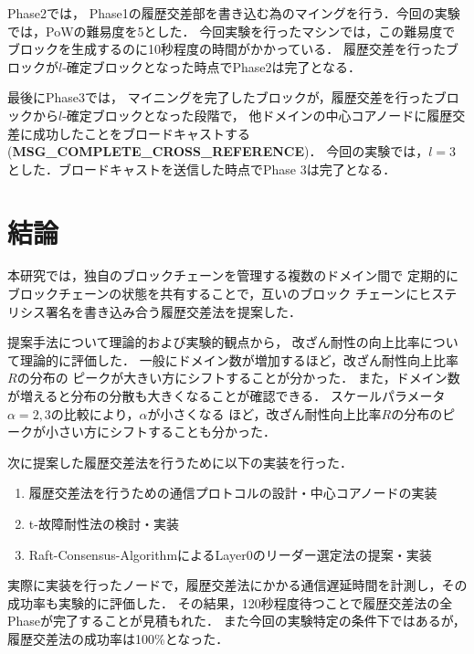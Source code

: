\documentclass[a4paper,12pt]{jsarticle}
\begin{document}
Phase2では，
Phase1の履歴交差部を書き込む為のマイングを行う．今回の実験では，PoWの難易度を5とした．
今回実験を行ったマシンでは，この難易度でブロックを生成するのに10秒程度の時間がかかっている．
履歴交差を行ったブロックが$l$-確定ブロックとなった時点でPhase2は完了となる．

最後にPhase3では，
マイニングを完了したブロックが，履歴交差を行ったブロックから$l$-確定ブロックとなった段階で，
他ドメインの中心コアノードに履歴交差に成功したことをブロードキャストする
 (\textbf{MSG\_COMPLETE\_CROSS\_REFERENCE})．
今回の実験では，$l=3$とした．ブロードキャストを送信した時点でPhase 3は完了となる．
\newpage
\section{結論}
本研究では，独自のブロックチェーンを管理する複数のドメイン間で
定期的にブロックチェーンの状態を共有することで，互いのブロック
チェーンにヒステリシス署名を書き込み合う履歴交差法を提案した．

提案手法について理論的および実験的観点から，
改ざん耐性の向上比率について理論的に評価した．
一般にドメイン数が増加するほど，改ざん耐性向上比率$R$の分布の
ピークが大きい方にシフトすることが分かった．
また，ドメイン数が増えると分布の分散も大きくなることが確認できる．
スケールパラメータ$\alpha=2,3$の比較により，$\alpha$が小さくなる
ほど，改ざん耐性向上比率$R$の分布のピークが小さい方にシフトすることも分かった．

次に提案した履歴交差法を行うために以下の実装を行った．
\begin{enumerate}
  \item 履歴交差法を行うための通信プロトコルの設計・中心コアノードの実装\\
  \hspace{12mm}
  \item t-故障耐性法の検討・実装\\
  \hspace{12mm}
  \item Raft-Consensus-AlgorithmによるLayer0のリーダー選定法の提案・実装\\
  \hspace{12mm}
\end{enumerate}

実際に実装を行ったノードで，履歴交差法にかかる通信遅延時間を計測し，その成功率も実験的に評価した．
その結果，120秒程度待つことで履歴交差法の全Phaseが完了することが見積もれた．
また今回の実験特定の条件下ではあるが，履歴交差法の成功率は100\%となった．
\end{document}
